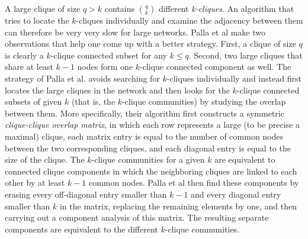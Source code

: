 A large clique of size $q >k $ contains $\binom{q}{k}$ different {\em k-cliques}.
An algorithm that tries to locate the $k$-cliques individually and examine the adjacency
between them can therefore be very very slow for large networks. 
Palla et al make two observations that help one come up with a better strategy.
First, a clique of size $q$ is clearly a $k$-clique connected subset for any $k \leq q$. 
Second, two large cliques that share at least $k-1$ nodes form one $k$-clique connected component as well.
The strategy of Palla et al. avoids searching for $k$-cliques individually
and instead first locates the large cliques in the network and then looks for the $k$-clique connected subsets of given $k$ (that is, the $k$-clique communities) by studying the overlap between them.
More specifically, their algorithm first constructs a symmetric {\em clique-clique overlap matrix}, 
in which each row represents a large (to be precise a maximal) clique, 
each matrix entry is equal to the number of common nodes between the two corresponding cliques, and each diagonal entry is equal to the size of the clique. 
The $k$-clique communities for a given $k$ are equivalent to connected 
clique components in which the neighboring cliques are linked to each other by at least $k-1$ common nodes. Palla et al then find these components by erasing every off-diagonal entry smaller than $k-1$ and every diagonal entry smaller than $k$ in the matrix, replacing the remaining elements by one, and then carrying out a component analysis of this matrix. The resulting separate components are equivalent to the different $k$-clique communities.
       



